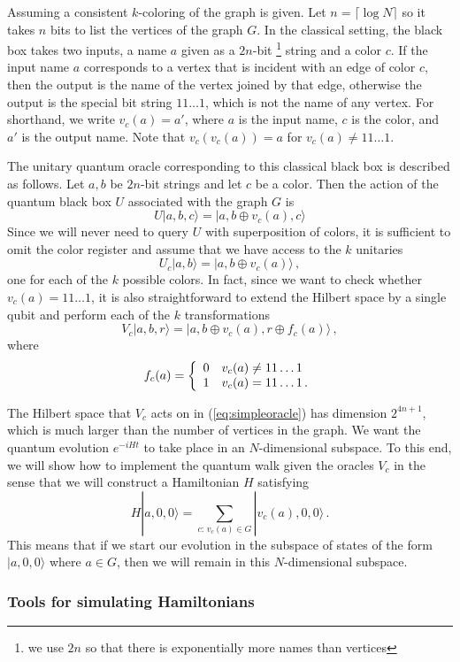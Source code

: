 \documentclass[aps,11pt,twoside,nofootinbib,tightenlines,superscriptaddress,preprintnumbers]{revtex4}
\makeatletter
\newcommand{\<}{\langle}
\renewcommand{\>}{\rangle}
\newcommand{\be}{\begin{equation}}
\newcommand{\ee}{\end{equation}}
\newcommand{\cond}[1]{\left\{\begin{array}{l@{~~~}l}#1\end{array}\right.}
\newenvironment{proof sketch}
{\trivlist\item\noindent{\bf Proof sketch}~}
{\qed\endtrivlist}
\makeatother
\begin{document}
Assuming a consistent $k$-coloring of the graph is given. Let $n=\lceil \log N \rceil$ so it takes $n$ bits to list the vertices of the graph $G$.  In the classical setting, the black box takes two inputs, a name $a$ given as a $2n$-bit \footnote{we use $2n$ so that there is exponentially more names than vertices} string and a color $c$.  If the input name $a$ corresponds to a vertex that is incident with an edge of color $c$, then the output is the name of the vertex joined by that edge, otherwise the output is the special bit string $11\ldots1$, which is not the name of any
vertex. For shorthand, we write $v_c(a)=a'$, where $a$ is the input name, $c$ is the color, and $a'$ is the output name. Note that $v_c(v_c(a))=a$ for $v_c(a) \ne 11\ldots1$.

The unitary quantum oracle corresponding to this classical black box is
described as follows.  Let $a,b$ be $2n$-bit strings and let $c$ be a
color.  Then the action of the quantum black box $U$ associated with the graph $G$ is
\be
  U |a,b,c\> = |a,b \oplus v_c(a),c\>
\label{eq:graphoracle}
\ee
Since we will never need to query $U$ with superposition of colors, it is sufficient to omit the color register and assume that we have access to the $k$ unitaries
\be
  U_c|a,b\> = |a,b \oplus v_c(a)\>
\,,
\ee
one for each of the $k$ possible colors. In fact, since we want to check whether $v_c(a)=11\ldots1$, it is also straightforward to extend the Hilbert space by a single qubit and perform each of the $k$ transformations
\be
  V_c|a,b,r\> = |a,b \oplus v_c(a),r \oplus f_c(a)\>
\,,
\label{eq:simpleoracle}
\ee
where
\be
  f_c(a) = \cond{
      0 & v_c(a) \ne 11\ldots1 \\
      1 & v_c(a) = 11\ldots1\,.}
\ee

The Hilbert space that $V_c$ acts on in (\ref{eq:simpleoracle}) has dimension $2^{4n+1}$, which is much larger than the number of vertices in the graph.  We want the quantum evolution $e^{-i H t}$ to take place in an $N$-dimensional subspace. To this end, we will show how to implement the
quantum walk given the oracles $V_c$ in the sense that we will construct a Hamiltonian $H$ satisfying
\be
  H |a, 0, 0\> = \sum_{c:\, v_c(a) \in G} |v_c(a),0,0\>
\,.
\label{eq:ham}
\ee
This means that if we start our evolution in the subspace of states of the
form $|a,0,0\>$ where $a \in G$, then we will remain in this
$N$-dimensional subspace.

\subsubsection{Tools for simulating Hamiltonians}
\end{document}
